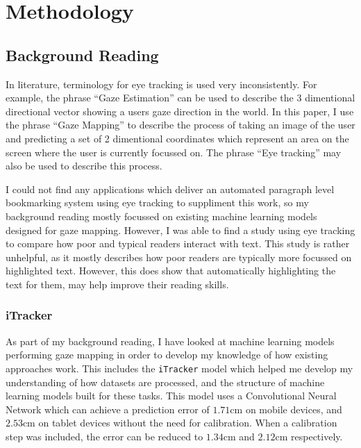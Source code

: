 \documentclass[twocolumn]{report}
\begin{document}
\chapter{Methodology}

\section{Background Reading}

\noindent
In literature, terminology for eye tracking is used very inconsistently. For example, the phrase ``Gaze Estimation'' can be used to describe the 3 dimentional directional vector showing a users gaze direction in the world. In this paper, I use the phrase ``Gaze Mapping'' to describe the process of taking an image of the user and predicting a set of 2 dimentional coordinates which represent an area on the screen where the user is currently focussed on. The phrase ``Eye tracking'' may also be used to describe this process. 

I could not find any applications which deliver an automated paragraph level bookmarking system using eye tracking to suppliment this work, so my background reading mostly focussed on existing machine learning models designed for gaze mapping. However, I was able to find a study \cite{barzvi2020eyetrackingdigialreading} using eye tracking to compare how poor and typical readers interact with text. This study is rather unhelpful, as it mostly describes how poor readers are typically more focussed on highlighted text. However, this does show that automatically highlighting the text for them, may help improve their reading skills. 



\subsection{iTracker}\label{sec:itracker}

As part of my background reading, I have looked at machine learning models performing gaze mapping in order to develop my knowledge of how existing approaches work. This includes the \verb|iTracker| model \cite{krafka2016eye} which helped me develop my understanding of how datasets are processed, and the structure of machine learning models built for these tasks. This model uses a Convolutional Neural Network which can achieve a prediction error of $1.71\text{cm}$ on mobile devices, and $2.53\text{cm}$ on tablet devices without the need for calibration. When a calibration step was included, the error can be reduced to $1.34\text{cm}$ and $2.12\text{cm}$ respectively. 
\end{document}
